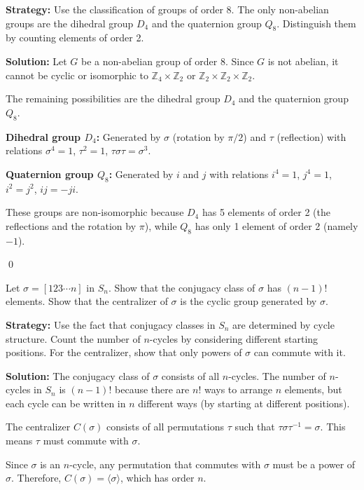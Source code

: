 \noindent\textbf{Strategy:} Use the classification of groups of order 8. The only non-abelian groups are the dihedral group $D_4$ and the quaternion group $Q_8$. Distinguish them by counting elements of order 2.

\noindent\textbf{Solution:} Let $G$ be a non-abelian group of order 8. Since $G$ is not abelian, it cannot be cyclic or isomorphic to $\mathbb{Z}_4 \times \mathbb{Z}_2$ or $\mathbb{Z}_2 \times \mathbb{Z}_2 \times \mathbb{Z}_2$.

The remaining possibilities are the dihedral group $D_4$ and the quaternion group $Q_8$.

\textbf{Dihedral group $D_4$:} Generated by $\sigma$ (rotation by $\pi/2$) and $\tau$ (reflection) with relations $\sigma^4 = 1$, $\tau^2 = 1$, $\tau\sigma\tau = \sigma^3$.

\textbf{Quaternion group $Q_8$:} Generated by $i$ and $j$ with relations $i^4 = 1$, $j^4 = 1$, $i^2 = j^2$, $ij = -ji$.

These groups are non-isomorphic because $D_4$ has 5 elements of order 2 (the reflections and the rotation by $\pi$), while $Q_8$ has only 1 element of order 2 (namely $-1$).


\qed
\begin{problembox}
Let $\sigma = [123 \cdots n]$ in $S_n$. Show that the conjugacy class of $\sigma$ has $(n - 1)!$ elements. Show that the centralizer of $\sigma$ is the cyclic group generated by $\sigma$.
\end{problembox}

\noindent\textbf{Strategy:} Use the fact that conjugacy classes in $S_n$ are determined by cycle structure. Count the number of $n$-cycles by considering different starting positions. For the centralizer, show that only powers of $\sigma$ can commute with it.

\noindent\textbf{Solution:} The conjugacy class of $\sigma$ consists of all $n$-cycles. The number of $n$-cycles in $S_n$ is $(n-1)!$ because there are $n!$ ways to arrange $n$ elements, but each cycle can be written in $n$ different ways (by starting at different positions).

The centralizer $C(\sigma)$ consists of all permutations $\tau$ such that $\tau\sigma\tau^{-1} = \sigma$. This means $\tau$ must commute with $\sigma$.

Since $\sigma$ is an $n$-cycle, any permutation that commutes with $\sigma$ must be a power of $\sigma$. Therefore, $C(\sigma) = \langle \sigma \rangle$, which has order $n$.

